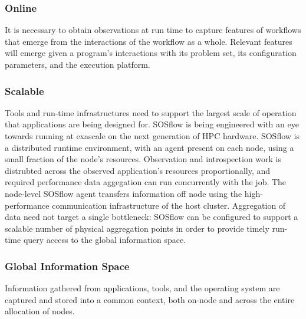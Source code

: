 \subsubsection{Online}
%
It is necessary to obtain observations at run time to capture features
of workflows that emerge from the interactions of the workflow as a
whole.
%
Relevant features will emerge given a program's interactions
with its problem set, its configuration parameters, and the execution platform.
%
\subsubsection{Scalable}
%
Tools and run-time infrastructures need to support the largest scale of
operation that applications are being designed for.
%
SOSflow is being engineered with an eye towards running at exascale
on the next generation of HPC hardware.
%
SOSflow is a distributed runtime environment, with an agent present
on each node, using a small fraction of the node's resources.
%
Observation and introspection work is distrubted across
the observed application's resources proportionally, and required
performance data aggegation can run concurrently with the job.
%
The node-level SOSflow agent transfers information off node using
the high-performance communication infrastructure of the host cluster.
%
Aggregation of data need not target a single bottleneck: SOSflow can
be configured to support a scalable number of physical aggregation
points in order to provide timely run-time query access to the global
information space.
%
\subsubsection{Global Information Space}
       Information gathered from applications, tools, and the
       operating system are captured and stored into a common context,
       both on-node and across the entire allocation of nodes.

